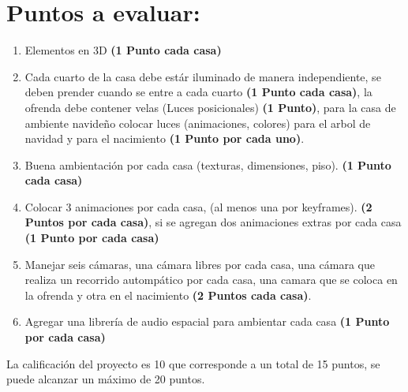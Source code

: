 \documentclass[12pt,letterpaper]{article}
\begin{document}
\section*{Puntos a evaluar:}
\begin{enumerate}
\item Elementos en 3D \textbf{(1 Punto cada casa)}
\item Cada cuarto de la casa debe estár iluminado de manera independiente, se deben prender cuando se entre a cada cuarto \textbf{(1 Punto cada casa)}, la ofrenda debe contener velas (Luces posicionales) \textbf{(1 Punto)}, para la casa de ambiente navideño colocar luces (animaciones, colores) para el arbol de navidad y para el nacimiento \textbf{(1 Punto por cada uno)}.
\item Buena ambientación por cada casa (texturas, dimensiones, piso). \textbf{(1 Punto cada casa)}
\item Colocar 3 animaciones por cada casa, (al menos una por keyframes). \textbf{(2 Puntos por cada casa)}, si se agregan dos animaciones extras por cada casa \textbf{(1 Punto por cada casa)}
\item Manejar seis cámaras, una cámara libres por cada casa, una cámara que realiza un recorrido autompático por cada casa, una camara que se coloca en la ofrenda y otra en el nacimiento \textbf{(2 Puntos cada casa)}.
\item Agregar una librería de audio espacial para ambientar cada casa \textbf{(1 Punto por cada casa)}
\end{enumerate}

La calificación del proyecto es 10 que corresponde a un total de 15 puntos, se puede alcanzar un máximo de 20 puntos.
\end{document}
